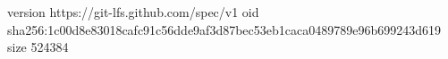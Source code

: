 version https://git-lfs.github.com/spec/v1
oid sha256:1c00d8e83018cafc91c56dde9af3d87bec53eb1caca0489789e96b699243d619
size 524384
